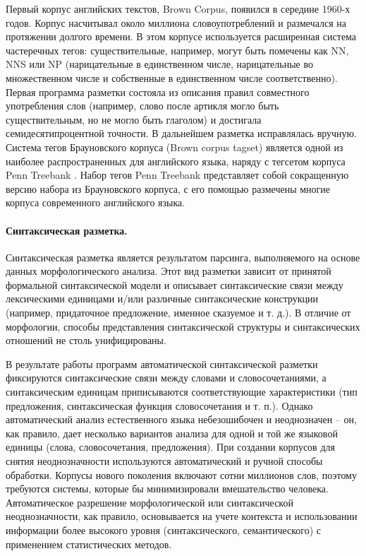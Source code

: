 \documentclass[12pt]{article}
\theoremstyle{definition}
\theoremstyle{remark}
\numberwithin{equation}{section}
\begin{document}
Первый корпус английских текстов, Brown Corpus, появился в середине 1960-х годов. Корпус насчитывал около миллиона словоупотреблений и размечался на протяжении долгого времени. В этом корпусе используется расширенная система частеречных тегов: существительные, например, могут быть помечены как NN, NNS или NP (нарицательные в единственном числе, нарицательные во множественном числе и собственные в единственном числе соответственно). Первая программа разметки состояла из описания правил совместного употребления слов (например, слово после артикля могло быть существительным, но не могло быть глаголом) и достигала семидесятипроцентной точности. В дальнейшем разметка исправлялась вручную. Система тегов Брауновского корпуса (Brown corpus tagset)  является одной из наиболее распространенных для английского языка, наряду с тегсетом корпуса Penn Treebank . Набор тегов Penn Treebank представляет собой сокращенную версию набора из Брауновского корпуса, с его помощью размечены многие корпуса современного английского языка.

\paragraph{Синтаксическая разметка.} Синтаксическая разметка является результатом парсинга, выполняемого на основе данных морфологического анализа. Этот вид разметки зависит от принятой формальной синтаксической модели и описывает синтаксические связи между лексическими единицами и/или различные синтаксические конструкции (например, придаточное предложение, именное сказуемое и т. д.). В отличие от морфологии, способы представления синтаксической структуры и синтаксических отношений не столь унифицированы.

В результате работы программ автоматической синтаксической разметки фиксируются синтаксические связи между словами и словосочетаниями, а синтаксическим единицам приписываются соответствующие характеристики (тип предложения, синтаксическая функция словосочетания и т. п.).
Однако автоматический анализ естественного языка небезошибочен и неоднозначен – он, как правило, дает несколько вариантов анализа для одной и той же языковой единицы (слова, словосочетания, предложения). При создании корпусов для снятия неоднозначности используются
автоматический и ручной способы обработки. Корпусы нового поколения включают сотни миллионов слов, поэтому требуются системы, которые бы минимизировали вмешательство человека. Автоматическое разрешение морфологической или синтаксической неоднозначности, как правило, основывается на учете
контекста и использовании информации более высокого уровня (синтаксического, семантического) с применением статистических методов.
\end{document}
